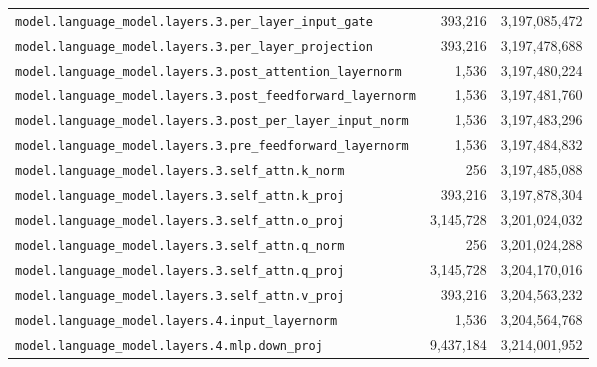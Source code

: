 \documentclass[10pt,a4paper]{article}
\theoremstyle{definition}
\begin{document}
\begin{appendices}
\begin{longtable}{p{9.5cm}rr}
\texttt{model.\allowbreak{}language\_model.\allowbreak{}layers.\allowbreak{}3.\allowbreak{}per\_layer\_input\_gate} & 393,216 & 3,197,085,472 \\
\texttt{model.\allowbreak{}language\_model.\allowbreak{}layers.\allowbreak{}3.\allowbreak{}per\_layer\_projection} & 393,216 & 3,197,478,688 \\
\texttt{model.\allowbreak{}language\_model.\allowbreak{}layers.\allowbreak{}3.\allowbreak{}post\_attention\_layernorm} & 1,536 & 3,197,480,224 \\
\texttt{model.\allowbreak{}language\_model.\allowbreak{}layers.\allowbreak{}3.\allowbreak{}post\_feedforward\_layernorm} & 1,536 & 3,197,481,760 \\
\texttt{model.\allowbreak{}language\_model.\allowbreak{}layers.\allowbreak{}3.\allowbreak{}post\_per\_layer\_input\_norm} & 1,536 & 3,197,483,296 \\
\texttt{model.\allowbreak{}language\_model.\allowbreak{}layers.\allowbreak{}3.\allowbreak{}pre\_feedforward\_layernorm} & 1,536 & 3,197,484,832 \\
\texttt{model.\allowbreak{}language\_model.\allowbreak{}layers.\allowbreak{}3.\allowbreak{}self\_attn.\allowbreak{}k\_norm} & 256 & 3,197,485,088 \\
\texttt{model.\allowbreak{}language\_model.\allowbreak{}layers.\allowbreak{}3.\allowbreak{}self\_attn.\allowbreak{}k\_proj} & 393,216 & 3,197,878,304 \\
\texttt{model.\allowbreak{}language\_model.\allowbreak{}layers.\allowbreak{}3.\allowbreak{}self\_attn.\allowbreak{}o\_proj} & 3,145,728 & 3,201,024,032 \\
\texttt{model.\allowbreak{}language\_model.\allowbreak{}layers.\allowbreak{}3.\allowbreak{}self\_attn.\allowbreak{}q\_norm} & 256 & 3,201,024,288 \\
\texttt{model.\allowbreak{}language\_model.\allowbreak{}layers.\allowbreak{}3.\allowbreak{}self\_attn.\allowbreak{}q\_proj} & 3,145,728 & 3,204,170,016 \\
\texttt{model.\allowbreak{}language\_model.\allowbreak{}layers.\allowbreak{}3.\allowbreak{}self\_attn.\allowbreak{}v\_proj} & 393,216 & 3,204,563,232 \\
\texttt{model.\allowbreak{}language\_model.\allowbreak{}layers.\allowbreak{}4.\allowbreak{}input\_layernorm} & 1,536 & 3,204,564,768 \\
\texttt{model.\allowbreak{}language\_model.\allowbreak{}layers.\allowbreak{}4.\allowbreak{}mlp.\allowbreak{}down\_proj} & 9,437,184 & 3,214,001,952 \\

\end{longtable}
\end{appendices}
\end{document}
